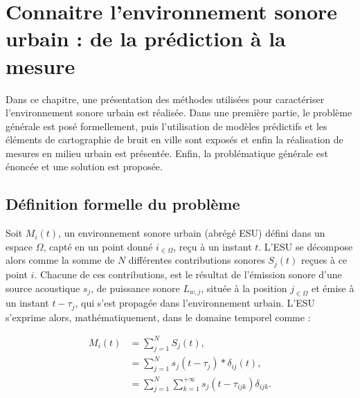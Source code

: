 
\chapter{Connaitre l'environnement sonore urbain : de la prédiction à la mesure}\label{chap:modele}
\thispagestyle{empty}

Dans ce chapitre, une présentation des méthodes utilisées pour caractériser l'environnement sonore urbain est réalisée. Dans une première partie, le problème générale est posé formellement, puis l'utilisation de modèles prédictifs et les éléments de cartographie de bruit en ville sont exposés et enfin la réalisation de mesures en milieu urbain est présentée. Enfin, la problématique générale est énoncée et une solution est proposée.

\section{Définition formelle du problème}

Soit $M_{i}(t)$, un environnement sonore urbain (abrégé ESU) défini dans un espace $\Omega$, capté en un point donné $i_{\in \Omega}$, reçu à un instant $t$. L'ESU se décompose alors comme la somme de $N$ différentes contributions sonores $S_j(t)$ reçues à ce point $i$. Chacune de ces contributions, est le résultat de l'émission sonore d'une source acoustique $s_j$, de puissance sonore $L_{w,j}$, située à la position $j_{\in \Omega}$ et émise à un instant $t-\tau_j$,  qui s'est propagée dans l'environnement urbain. L'ESU s'exprime alors, mathématiquement, dans le domaine temporel comme : 

\begin{subequations}\label{eq:esu_formel}
\begin{align}
M_i(t) &= \sum_{j = 1}^{N}S_j(t), \\
 & = \sum_{j = 1}^{N} s_j(t-\tau_j) \ast \delta_{ij}(t), \label{eq:convolution_ESU}\\
 & = \sum_{j = 1}^{N} \sum_{k = 1}^{+\infty} s_j(t-\tau_{ijk}) \delta_{ijk}.\label{eq:propagation}
\end{align}
\end{subequations}

